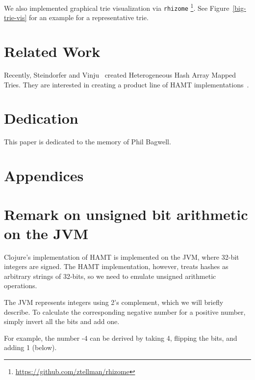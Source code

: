 \documentclass[preprint]{sigplanconf}
\begin{document}
We also implemented graphical trie visualization 
via \texttt{rhizome}
\footnote{\url{https://github.com/ztellman/rhizome}}.
See Figure~\ref{big-trie-vis} for an example
for a representative trie.

\section{Related Work}

Recently, Steindorfer and Vinju~\cite{Steindorfer:2015:OHM:2814270.2814312}
created Heterogeneous Hash Array Mapped Tries.
They are interested in creating a product line of HAMT
implementations~\cite{Steindorfer:2016:TSP:2993236.2993251}.


\section{Dedication}
This paper is dedicated to the memory of Phil Bagwell.

\printbibliography[title=References]

\newpage
\appendix
\section*{Appendices}

\section{Remark on unsigned bit arithmetic on the JVM}
\label{jvm-bit-remark}

Clojure's implementation of HAMT is implemented on the JVM,
where 32-bit integers are signed.
The HAMT implementation, however, treats hashes as
arbitrary strings of 32-bits, so we need to emulate
unsigned arithmetic operations.

The JVM represents integers using 2's complement,
which we will briefly describe.
To calculate the corresponding negative number for
a positive number, simply invert all the bits and add one.

For example, the number -4 can be derived by taking
4, flipping the bits, and adding 1 (below).
\end{document}
